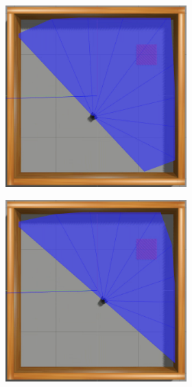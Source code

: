 \begin{figure}[H]
\begin{center}
\begin{subfigure}[b]{0.60\textwidth}
\begin{subfigure}[b]{0.24\textwidth}
        \end{subfigure}
        \hfill
        \begin{subfigure}[b]{0.24\textwidth}
            \includegraphics[width=\textwidth]{imagens/simulated_envs/sim_env1_ddpg/3.png}
        \end{subfigure}
        \hfill
        \begin{subfigure}[b]{0.24\textwidth}
            \includegraphics[width=\textwidth]{imagens/simulated_envs/sim_env1_ddpg/4.png}
        \end{subfigure}
        

\end{subfigure}
\end{center}
\end{figure}
